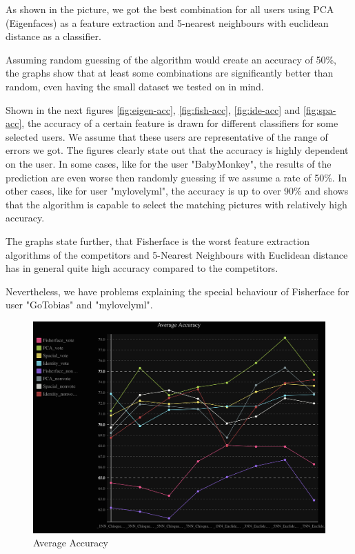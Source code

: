 \documentclass{report}
\begin{document}
As shown in the picture, we got the best combination for all users using PCA (Eigenfaces) as a feature extraction and 5-nearest neighbours with euclidean distance as a classifier.

Assuming random guessing of the algorithm would create an accuracy of 50\%, the graphs show that at least some combinations are significantly better than random, even having the small dataset we tested on in mind.

Shown in the next figures \ref{fig:eigen-acc}, \ref{fig:fish-acc}, \ref{fig:ide-acc} and \ref{fig:spa-acc}, the accuracy of a certain feature is drawn for different classifiers for some selected users.
We assume that these users are representative of the range of errors we got.
The figures clearly state out that the accuracy is highly dependent on the user.
In some cases, like for the user "BabyMonkey", the results of the prediction are even worse then randomly guessing if we assume a rate of 50\%.
In other cases, like for user "mylovelyml", the accuracy is up to over 90\% and shows that the algorithm is capable to select the matching pictures with relatively high accuracy.

The graphs state further, that Fisherface is the worst feature extraction algorithms of the competitors and 5-Nearest Neighbours with Euclidean distance has in general quite high accuracy compared to the competitors.

Nevertheless, we have problems explaining the special behaviour of Fisherface for user "GoTobias" and "mylovelyml".

\begin{figure}[!htb]
  \centering
  \includegraphics[scale=0.2]{images/accuracy_line.png}
  \caption{Average Accuracy}
  \label{fig:acc}
\end{figure}
\end{document}
